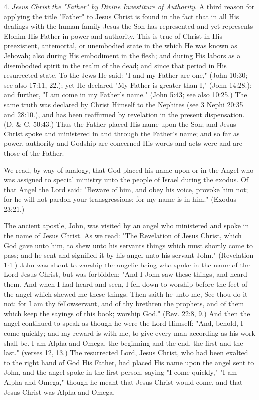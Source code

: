4. \textit{Jesus Christ the "Father" by Divine Investiture of Authority}. A third reason for applying
the title "Father" to Jesus Christ is found in the fact that in all His dealings with the human
family Jesus the Son has represented and yet represents Elohim His Father in power and
authority. This is true of Christ in His preexistent, antemortal, or unembodied state in the
which He was known as Jehovah; also during His embodiment in the flesh; and during His
labors as a disembodied spirit in the realm of the dead; and since that period in His
resurrected state. To the Jews He said: "I and my Father are one," (John 10:30; see also
17:11, 22.); yet He declared "My Father is greater than I," (John 14:28.); and further, "I am
come in my Father's name." (John 5:43; see also 10:25.) The same truth was declared by
Christ Himself to the Nephites (see 3 Nephi 20:35 and 28:10.), and has been reaffirmed by
revelation in the present dispensation. (D. \& C. 50:43.) Thus the Father placed His name
upon the Son; and Jesus Christ spoke and ministered in and through the Father's name; and
so far as power, authority and Godship are concerned His words and acts were and are those
of the Father.

We read, by way of analogy, that God placed his name upon or in the Angel who was
assigned to special ministry unto the people of Israel during the exodus. Of that Angel the
Lord said: "Beware of him, and obey his voice, provoke him not; for he will not pardon your
transgressions: for my name is in him." (Exodus 23:21.)

The ancient apostle, John, was visited by an angel who ministered and spoke in the name of
Jesus Christ. As we read: "The Revelation of Jesus Christ, which God gave unto him, to shew
unto his servants things which must shortly come to pass; and he sent and signified it by his
angel unto his servant John." (Revelation 1:1.) John was about to worship the angelic being
who spoke in the name of the Lord Jesus Christ, but was forbidden: "And I John saw these
things, and heard them. And when I had heard and seen, I fell down to worship before the
feet of the angel which shewed me these things. Then saith he unto me, See thou do it not:
for I am thy fellowservant, and of thy brethren the prophets, and of them which keep the
sayings of this book; worship God." (Rev. 22:8, 9.) And then the angel continued to speak as
though he were the Lord Himself: "And, behold, I come quickly; and my reward is with me,
to give every man according as his work shall be. I am Alpha and Omega, the beginning and
the end, the first and the last." (verses 12, 13.) The resurrected Lord, Jesus Christ, who had
been exalted to the right hand of God His Father, had placed His name upon the angel sent to
John, and the angel spoke in the first person, saying "I come quickly," "I am Alpha and
Omega," though he meant that Jesus Christ would come, and that Jesus Christ was Alpha and
Omega.

